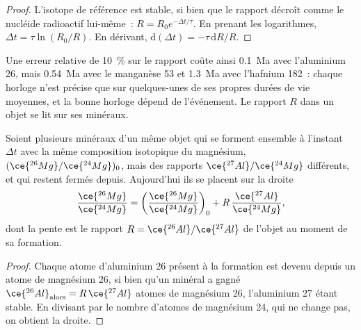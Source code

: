 \begin{proof}
L'isotope de référence est stable, si bien que le rapport décroît comme le nucléide radioactif
lui-même~: $R = R_0 e^{-\Delta t/\tau}$. En prenant les logarithmes,
$\Delta t = \tau\ln(R_0/R)$. En dérivant, $\mathrm d(\Delta t) =
-\tau\,\mathrm dR/R$.
\end{proof}

Une erreur relative de \qty{10}{\percent} sur le rapport coûte ainsi \qty{0.1}{Ma}
avec l'aluminium 26, mais \qty{0.54}{Ma} avec le manganèse 53 et \qty{1.3}{Ma} avec
l'hafnium 182~: chaque horloge n'est précise que sur quelques-unes de ses propres
durées de vie moyennes, et la bonne horloge dépend de l'événement. Le rapport $R$ dans
un objet se lit sur ses minéraux.

\begin{proposition}
\label{prop:b2:planet-formation-meteorites:al-mg}
Soient plusieurs minéraux d'un même objet qui se forment ensemble à l'instant $\Delta t$ avec la
même composition isotopique du magnésium, $(\ce{^{26}Mg}/\ce{^{24}Mg})_0$, mais des rapports
$\ce{^{27}Al}/\ce{^{24}Mg}$ différents, et qui restent fermés depuis. Aujourd'hui ils se placent
sur la droite
\[
  \frac{\ce{^{26}Mg}}{\ce{^{24}Mg}}
  = \left(\frac{\ce{^{26}Mg}}{\ce{^{24}Mg}}\right)_0
  + R\,\frac{\ce{^{27}Al}}{\ce{^{24}Mg}},
\]
dont la pente est le rapport $R = \ce{^{26}Al}/\ce{^{27}Al}$ de l'objet au
moment de sa formation.
\end{proposition}

\begin{proof}
Chaque atome d'aluminium 26 présent à la formation est devenu depuis un atome
de magnésium 26, si bien qu'un minéral a gagné
$\ce{^{26}Al}_{\text{alors}} = R\,\ce{^{27}Al}$ atomes de magnésium 26,
l'aluminium 27 étant stable. En divisant par le nombre d'atomes de magnésium
24, qui ne change pas, on obtient la droite.
\end{proof}

